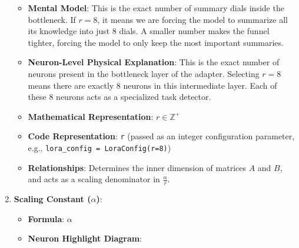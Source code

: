 \begin{enumerate}
\begin{itemize}
      \item \textbf{Mental Model}: This is the exact number of summary dials inside the bottleneck. If $r=8$, it means we are forcing the model to summarize all its knowledge into just $8$ dials. A smaller number makes the funnel tighter, forcing the model to only keep the most important summaries.
      \item \textbf{Neuron-Level Physical Explanation}: This is the exact number of neurons present in the bottleneck layer of the adapter. Selecting $r=8$ means there are exactly 8 neurons in this intermediate layer. Each of these 8 neurons acts as a specialized task detector.
      \item \textbf{Mathematical Representation}: $r \in \mathbb{Z}^{+}$
      \item \textbf{Code Representation}: \texttt{r} (passed as an integer configuration parameter, e.g., \texttt{lora\_config = LoraConfig(r=8)})
      \item \textbf{Relationships}: Determines the inner dimension of matrices $A$ and $B$, and acts as a scaling denominator in $\frac{\alpha}{r}$.
    \end{itemize}

  \item \textbf{Scaling Constant ($\alpha$)}:
    \begin{itemize}
      \item \textbf{Formula}: $\alpha$
      \item \textbf{Neuron Highlight Diagram}:

\begin{center}
\begin{adjustbox}{max width=0.85\linewidth}
\end{adjustbox}
\end{center}
\end{itemize}
\end{enumerate}
